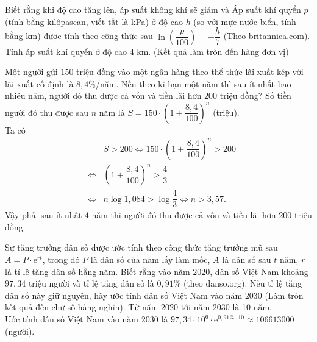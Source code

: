 \begin{ex}%
Biết rằng khi độ cao tăng lên, áp suất không khí sẽ giảm và Áp suất khí quyển $p$ (tính bằng kilôpascan, viết tắt là kPa) ở độ cao $h$ (so với mực nước biển, tính bằng km) được tính theo công thức sau $\ln\left(\dfrac{p}{100}\right) = -\dfrac{h}{7}$
(Theo britannica.com).  Tính áp suất khí quyển ở độ cao 4 km. (Kết quả làm tròn đến hàng đơn vị)
\end{ex}

\begin{ex}%
	Một người gửi $150$ triệu đồng vào một ngân hàng theo thể thức lãi xuất kép với lãi xuất cố định là $8,4\%$/năm. Nếu theo kì hạn một năm thì sau ít nhất bao nhiêu năm, người đó thu được cả vốn và tiền lãi hơn $200$ triệu đồng?
	\loigiai
	{
		Số tiền người đó thu được sau $n$ năm là $S=150\cdot{\left(1+\dfrac{8,4}{100}\right)^n}$ (triệu).\\
		Ta có 
		\begin{eqnarray*}
			& & S>200\Leftrightarrow 150 \cdot{\left(1+\dfrac{8,4}{100}\right)^n}>200\\
			&\Leftrightarrow &{\left(1+\dfrac{8,4}{100}\right)^n}>\dfrac{4}{3}\\
			&\Leftrightarrow& n\log 1,084>\log \dfrac{4}{3}\Leftrightarrow n>3{,}57.
		\end{eqnarray*}
		Vậy phải sau ít nhất $4$ năm thì người đó thu được cả vốn và tiền lãi hơn $200$ triệu đồng.
	}
\end{ex}

\begin{ex}%
	Sự tăng trưởng dân số được ước tính theo công thức tăng trưởng mũ sau $A=P \cdot \mathrm{e}^{rt}$, trong đó $P$ là dân số của năm lấy làm mốc, $A$ là dân số sau $t$ năm, $r$ là tỉ lệ tăng dân số hằng năm. Biết rằng vào năm $2020$, dân số Việt Nam khoảng $97{,}34$ triệu người và tỉ lệ tăng dân số là $0,91\% $ (theo danso.org). Nếu tỉ lệ tăng dân số này giữ nguyên, hãy ước tính dân số Việt Nam vào năm $2030$ (Làm tròn kết quả đến chữ số hàng nghìn).
	\loigiai
	{
		Từ năm 2020 tới năm 2030 là 10 năm.\\
		Ước tính dân số Việt Nam vào năm 2030 là $97{,}34 \cdot 10^6 \cdot \mathrm{e}^{0{,}91\% \cdot 10} \approx 106613000$ (người).
	}
\end{ex}


